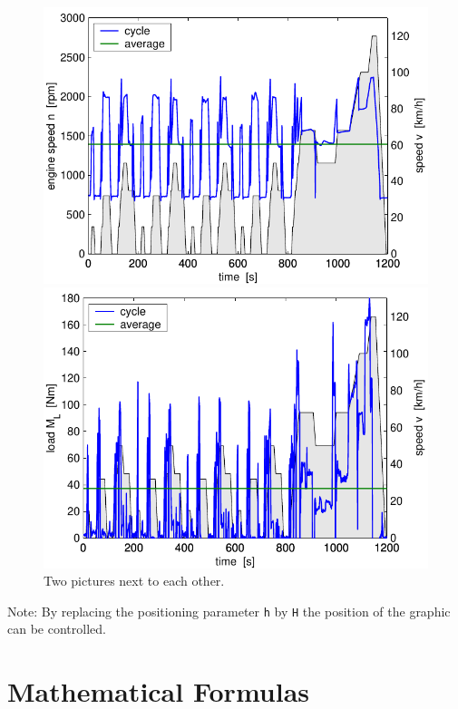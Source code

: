 \begin{figure}[h]
  \begin{minipage}[t]{0.48\textwidth}
    \includegraphics[width = \textwidth]{pics/cycle_we.pdf}
  \end{minipage}
  \hfill
  \begin{minipage}[t]{0.48\textwidth}
    \includegraphics[width = \textwidth]{pics/cycle_ml.pdf}
  \end{minipage}
  \caption{Two pictures next to each other.}
  \label{pics:cycle}
\end{figure}

Note: By replacing the positioning parameter \texttt{h} by \texttt{H} the position of the graphic can be controlled.

\section{Mathematical Formulas}\label{sec:math}


